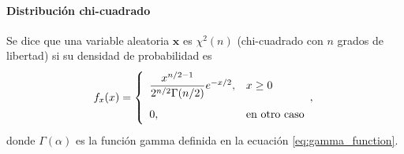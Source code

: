 \documentclass[a4paper]{report}
\newcommand{\x}{\mathbf{x}}
\begin{document}
\paragraph{Distribución chi-cuadrado}

Se dice que una variable aleatoria \(\x\) es \(\chi^2(n)\) (chi-cuadrado con \(n\) grados de libertad) si su densidad de probabilidad es
\begin{equation}\label{eq:pdf_chi_square}
\def\arraystretch{2.0}
 f_x(x)=
 \left\{\begin{array}{ll}
  \dfrac{x^{n/2-1}}{2^{n/2}\Gamma(n/2)} e^{-x/2}, & x\geq 0\\
  0, & \textrm{en otro caso}
 \end{array}, \right.
\end{equation}
donde \(\Gamma(\alpha)\) es la función gamma definida en la ecuación \ref{eq:gamma_function}.
\end{document}
